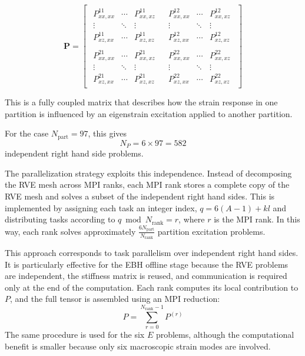 \documentclass[12pt]{article}
\begin{document}
\begin{equation}
\mathbf{P}
=
\begin{bmatrix}
\boxed{
\begin{matrix}
P^{11}_{xx,xx} & \cdots & P^{11}_{xx,xz} \\
\vdots & \ddots & \vdots \\
P^{11}_{xz,xx} & \cdots & P^{11}_{xz,xz}
\end{matrix}}
&
\boxed{
\begin{matrix}
P^{12}_{xx,xx} & \cdots & P^{12}_{xx,xz} \\
\vdots & \ddots & \vdots \\
P^{12}_{xz,xx} & \cdots & P^{12}_{xz,xz}
\end{matrix}}
\\[1.5em]
\boxed{
\begin{matrix}
P^{21}_{xx,xx} & \cdots & P^{21}_{xx,xz} \\
\vdots & \ddots & \vdots \\
P^{21}_{xz,xx} & \cdots & P^{21}_{xz,xz}
\end{matrix}}
&
\boxed{
\begin{matrix}
P^{22}_{xx,xx} & \cdots & P^{22}_{xx,xz} \\
\vdots & \ddots & \vdots \\
P^{22}_{xz,xx} & \cdots & P^{22}_{xz,xz}
\end{matrix}}
\end{bmatrix}
\end{equation}

This is a fully coupled matrix that describes how the strain response in one partition is influenced by an eigenstrain excitation applied to another partition.

For the case $N_{\mathrm{part}}=97$, this gives
\begin{equation}
N_P = 6 \times 97 = 582
\end{equation}
independent right hand side problems.

The parallelization strategy exploits this independence. Instead of decomposing the RVE mesh across MPI ranks, each MPI rank stores a complete copy of the RVE mesh and solves a subset of the independent right hand sides. This is implemented by assigning each task an integer index, $q = 6(A-1) + kl$ and distributing tasks according to
$q \bmod N_{\mathrm{rank}} = r$, where $r$ is the MPI rank. In this way, each rank solves approximately $\frac{6N_{\mathrm{part}}}{N_{\mathrm{rank}}}$ partition excitation problems.

This approach corresponds to task parallelism over independent right hand sides. It is particularly effective for the EBH offline stage because the RVE problems are independent, the stiffness matrix is reused, and communication is required only at the end of the computation. Each rank computes its local contribution to $P$, and the full tensor is assembled using an MPI reduction:
\begin{equation}
P = \sum_{r=0}^{N_{\mathrm{rank}}-1} P^{(r)}
\end{equation}
The same procedure is used for the six $E$ problems, although the computational benefit is smaller because only six macroscopic strain modes are involved.
\end{document}
